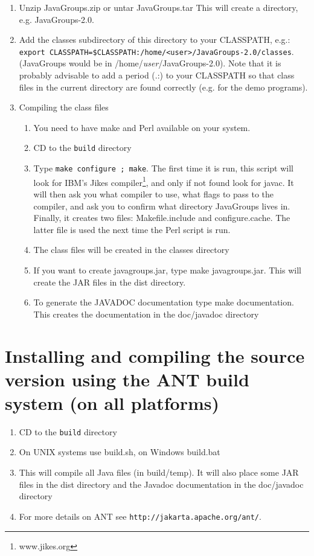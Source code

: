   \begin{enumerate}
  \item Unzip JavaGroups.zip or untar JavaGroups.tar This will create a directory, e.g. JavaGroups-2.0.
  \item Add the classes subdirectory of this directory to your CLASSPATH, e.g.: 
        {\tt export CLASSPATH=\$CLASSPATH:/home/<user>/JavaGroups-2.0/classes}.
             (JavaGroups would be in /home/{\em user}/JavaGroups-2.0). Note that it is
             probably advisable to add a period (.:) to your
             CLASSPATH so that class files in the current directory are found
             correctly (e.g. for the demo programs). 
  \item Compiling the class files
    \begin{enumerate} 
    \item You need to have make and Perl available on your system. 
    \item CD to the {\tt build} directory
    \item Type {\tt make configure ; make}. The first time it is run,
          this script will look for IBM's Jikes compiler\footnote{www.jikes.org}, and only if not
          found look for javac. It will then ask you what compiler to use, what flags
          to pass to the compiler, and ask you to confirm
          what directory JavaGroups lives in. Finally, it creates two files:
	  Makefile.include and configure.cache. The latter file is used the next time the Perl script is run. 
    \item The class files will be created in the classes directory 
    \item If you want to create javagroups.jar, type make javagroups.jar. This will
          create the JAR files in the dist directory.
    \item To generate the JAVADOC documentation type make documentation. This creates
          the documentation in the doc/javadoc directory  
    \end{enumerate} 
  \end{enumerate}



  \section{Installing and compiling the source version using the ANT build system (on all platforms)}

  \begin{enumerate}
  \item CD to the {\tt build} directory
  \item On UNIX systems use build.sh, on Windows build.bat 
  \item This will compile all Java files (in build/temp). It will also place some JAR
        files in the dist directory and the Javadoc documentation in the doc/javadoc directory 
  \item For more details on ANT see {\tt http://jakarta.apache.org/ant/}.
  \end{enumerate}



